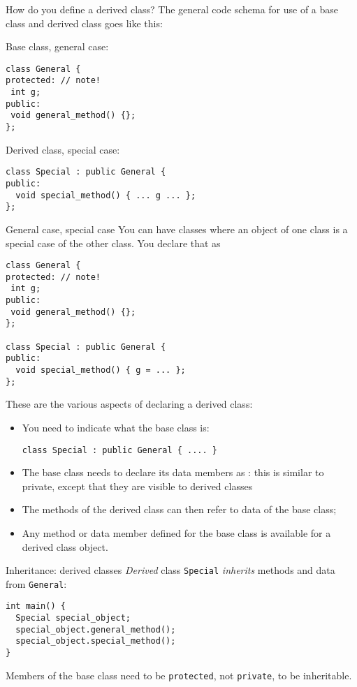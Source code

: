 How do you define a derived class?
The general code schema for use of a base class and derived class goes like this:

\begin{multicols}{2}
Base class, general case:
\begin{lstlisting}
class General {
protected: // note!
 int g;
public:
 void general_method() {};
};
\end{lstlisting}
\columnbreak
Derived class, special case:
\begin{lstlisting}
class Special : public General {
public:
  void special_method() { ... g ... };
};
\end{lstlisting}
\end{multicols}

\begin{slide}{General case, special case}
  \label{sl:obj-case}
  You can have classes where an object of one class is a special case of
  the other class. You declare that as
  \lstset{style=snippetcode}
\begin{lstlisting}
class General {
protected: // note!
 int g;
public:
 void general_method() {};
};

class Special : public General {
public:
  void special_method() { g = ... };
};
\end{lstlisting}
\end{slide}

These are the various aspects of declaring a derived class:
\begin{itemize}
\item You need to indicate what the base class is:
\begin{lstlisting}
class Special : public General { .... }
\end{lstlisting}
\item The base class needs to declare its data members as
  : this is similar to private, except that
  they are visible to derived classes
\item The methods of the derived class can then refer to data of the
  base class;
\item Any method or data member defined for the base class is available
  for a derived class object.
\end{itemize}

\begin{slide}{Inheritance: derived classes}
  \label{sl:obj-derive}
  \emph{Derived} class \lstinline{Special}
  \emph{inherits} methods and data from
   \lstinline{General}:
  \lstset{style=snippetcode}
\begin{lstlisting}
int main() {
  Special special_object;
  special_object.general_method();
  special_object.special_method();
}
\end{lstlisting}
Members of the base class need to be \lstinline{protected},
not \lstinline{private}, to be inheritable.
\end{slide}

